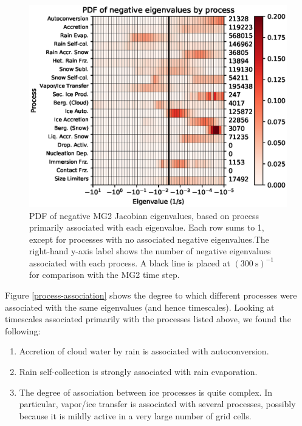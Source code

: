 \documentclass [11pt, proquest] {uwthesis}[2020/02/24]
\begin{document}
\begin{figure}[ht]
  \includegraphics[width=6.5in]{./time_hist_process_2D_neg.eps}
  \caption{PDF of negative MG2 Jacobian eigenvalues, based on process primarily associated with each eigenvalue. Each row sums to \num{1}, except for processes with no associated negative eigenvalues.The right-hand y-axis label shows the number of negative eigenvalues associated with each process. A black line is placed at $(\SI{300}{\second})^{-1}$ for comparison with the MG2 time step.}
  \label{process-2D-neg-eig}
\end{figure}

Figure \ref{process-association} shows the degree to which different processes were associated with the same eigenvalues (and hence timescales). Looking at timescales associated primarily with the processes listed above, we found the following:

\begin{enumerate}
\item Accretion of cloud water by rain is associated with autoconversion.
\item Rain self-collection is strongly associated with rain evaporation.
\item The degree of association between ice processes is quite complex. In particular, vapor/ice transfer is associated with several processes, possibly because it is mildly active in a very large number of grid cells.
\end{enumerate}
\end{document}
